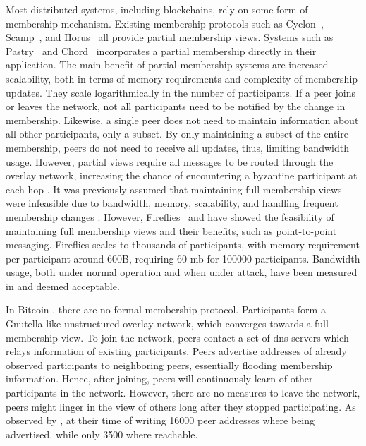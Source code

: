\documentclass[USenglish]{uit-thesis}
\begin{document}



Most distributed systems, including blockchains, rely on some form of membership mechanism.
Existing membership protocols such as Cyclon~\cite{cyclon}, Scamp~\cite{scamp}, and Horus~\cite{horus} all provide partial membership views.
Systems such as Pastry~\cite{pastry} and Chord~\cite{chord} incorporates a partial membership directly in their application.
The main benefit of partial membership systems are increased scalability, both in terms of memory requirements and complexity of membership updates.
They scale logarithmically in the number of participants.
If a peer joins or leaves the network, not all participants need to be notified by the change in membership.
Likewise, a single peer does not need to maintain information about all other participants, only a subset.
By only maintaining a subset of the entire membership, peers do not need to receive all updates, thus, limiting bandwidth usage.
However, partial views require all messages to be routed through the overlay network, increasing the chance of encountering a byzantine participant at each hop \cite{onehop}.
It was previously assumed that maintaining full membership views were infeasible due to bandwidth, memory, scalability, and handling frequent membership changes \cite{p2pmem}.
However, Fireflies~\cite{flies, flies2} and \cite{onehop} have showed the feasibility of maintaining full membership views and their benefits, such as point-to-point messaging.
Fireflies scales to thousands of participants, with memory requirement per participant around 600B, requiring 60 \gls{mb} for 100000 participants.
Bandwidth usage, both under normal operation and when under attack, have been measured in \cite{flies} and deemed acceptable.
 
 
In Bitcoin \cite{bitcoin}, there are no formal membership protocol. 
Participants form a Gnutella-like \cite{gnutella} unstructured overlay network, which converges towards a full membership view.
To join the network, peers contact a set of \gls{dns} servers which relays information of existing participants.
Peers advertise addresses of already observed participants to neighboring peers, essentially flooding membership information.
Hence, after joining, peers will continuously learn of other participants in the network.   
However, there are no measures to leave the network, peers might linger in the view of others long after they stopped participating.
As observed by \cite{propa}, at their time of writing 16000 peer addresses where being advertised, while only 3500 where reachable.
\end{document}
